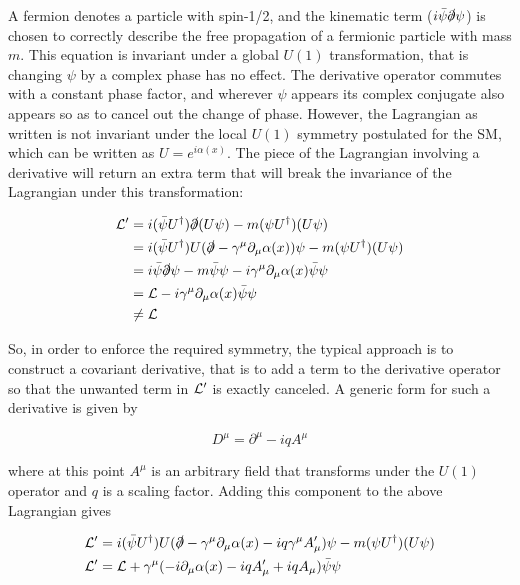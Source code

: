 \noindent A fermion denotes a particle with spin-1/2, and the kinematic term ($i\bar{\psi}\slashed{\partial}\psi$) is chosen to correctly describe the free propagation of a fermionic particle with mass $m$. 
This equation is invariant under a global $U(1)$ transformation, that is changing $\psi$ by a complex phase has no effect. 
The derivative operator commutes with a constant phase factor, and wherever $\psi$ appears its complex conjugate also appears so as to cancel out the change of phase. 
However, the Lagrangian as written is not invariant under the local $U(1)$ symmetry postulated for the \ac{SM}, which can be written as $U = e^{i\alpha(x)}$. 
The piece of the Lagrangian involving a derivative will return an extra term that will break the invariance of the Lagrangian under this transformation:

\begin{align*}
 \mathcal{L}' &= i (\bar{\psi}U^\dagger)\slashed{\partial}(U\psi) - m(\psi U^\dagger)(U\psi) \\
      &= i (\bar{\psi}U^\dagger) U(\slashed{\partial} - \gamma^\mu \partial_\mu\alpha(x))\psi - m(\psi U^\dagger)(U\psi) \\
      &= i \bar{\psi}\slashed{\partial}\psi -m\bar{\psi}\psi - i\gamma^\mu \partial_\mu\alpha(x)\bar{\psi}\psi  \\
      &= \mathcal{L} -  i\gamma^\mu \partial_\mu\alpha(x)\bar{\psi}\psi \\
      &\neq \mathcal{L} 
\end{align*}

\noindent So, in order to enforce the required symmetry, the typical approach is to construct a covariant derivative, that is to add a term to the derivative operator so that the unwanted term in $\mathcal{L}'$ is exactly canceled. 
A generic form for such a derivative is given by

\[ D^\mu = \partial^{\mu} - iqA^\mu \]

\noindent where at this point $A^\mu$ is an arbitrary field that transforms under the $U(1)$ operator and $q$ is a scaling factor. Adding this component to the above Lagrangian gives

\begin{align}
 \mathcal{L}' &=  i (\bar{\psi}U^\dagger) U(\slashed{\partial} - \gamma^\mu \partial_\mu\alpha(x) - iq\gamma^\mu A'_{\mu})\psi - m(\psi U^\dagger)(U\psi) \\
 \mathcal{L}' &= \mathcal{L} +\gamma^\mu (- i\partial_\mu\alpha(x) - iqA'_{\mu} + iqA_\mu)\bar{\psi}\psi 
\end{align}


